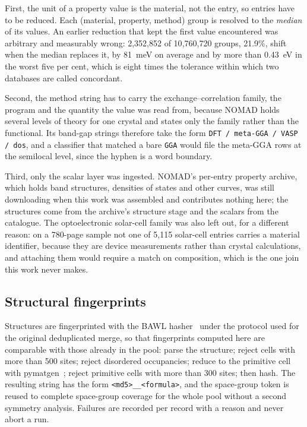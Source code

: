 First, the unit of a property value is the material, not the entry, so entries
have to be reduced. Each (material, property, method) group is resolved to the
\emph{median} of its values. An earlier reduction that kept the first value
encountered was arbitrary and measurably wrong: 2{,}352{,}852 of 10{,}760{,}720
groups, 21.9\%, shift when the median replaces it, by 81~meV on average and by
more than 0.43~eV in the worst five per cent, which is eight times the tolerance
within which two databases are called concordant.

Second, the method string has to carry the exchange--correlation family, the
program and the quantity the value was read from, because NOMAD holds several
levels of theory for one crystal and states only the family rather than the
functional. Its band-gap strings therefore take the form \texttt{DFT / meta-GGA /
VASP / dos}, and a classifier that matched a bare \texttt{GGA} would file the
meta-GGA rows at the semilocal level, since the hyphen is a word boundary.

Third, only the scalar layer was ingested. NOMAD's per-entry property archive,
which holds band structures, densities of states and other curves, was still
downloading when this work was assembled and contributes nothing here; the
structures come from the archive's structure stage and the scalars from the
catalogue. The optoelectronic solar-cell family was also left out, for a
different reason: on a 780-page sample not one of 5{,}115 solar-cell entries
carries a material identifier, because they are device measurements rather than
crystal calculations, and attaching them would require a match on composition,
which is the one join this work never makes.

\subsection{Structural fingerprints}

Structures are fingerprinted with the BAWL hasher~\cite{ramlaoui2025lemat} under
the protocol used for the original deduplicated merge, so that fingerprints
computed here are comparable with those already in the pool: parse the structure;
reject cells with more than 500 sites; reject disordered occupancies; reduce to
the primitive cell with pymatgen~\cite{ong2013python}; reject primitive cells with
more than 300 sites; then hash. The resulting string has the form
\texttt{<md5>\_<space group>\_<formula>}, and the space-group token is reused to
complete space-group coverage for the whole pool without a second symmetry
analysis. Failures are recorded per record with a reason and never abort a run.

